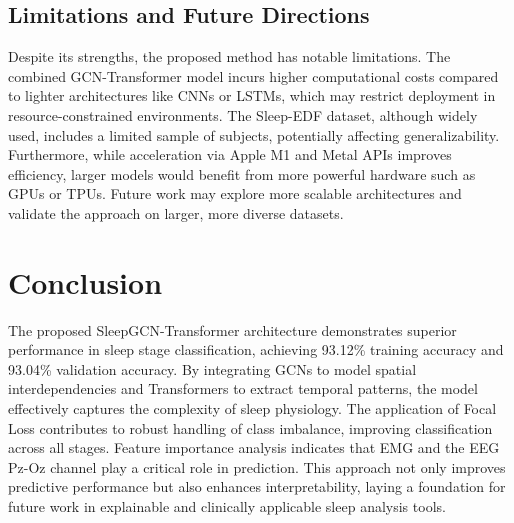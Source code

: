 \subsection{Limitations and Future Directions}
Despite its strengths, the proposed method has notable limitations. The combined GCN-Transformer model incurs higher computational costs compared to lighter architectures like CNNs or LSTMs, which may restrict deployment in resource-constrained environments. The Sleep-EDF dataset, although widely used, includes a limited sample of subjects, potentially affecting generalizability. Furthermore, while acceleration via Apple M1 and Metal APIs improves efficiency, larger models would benefit from more powerful hardware such as GPUs or TPUs. Future work may explore more scalable architectures and validate the approach on larger, more diverse datasets.

\section{Conclusion}

The proposed SleepGCN-Transformer architecture demonstrates superior performance in sleep stage classification, achieving 93.12\% training accuracy and 93.04\% validation accuracy. By integrating GCNs to model spatial interdependencies and Transformers to extract temporal patterns, the model effectively captures the complexity of sleep physiology. The application of Focal Loss contributes to robust handling of class imbalance, improving classification across all stages. Feature importance analysis indicates that EMG and the EEG Pz-Oz channel play a critical role in prediction. This approach not only improves predictive performance but also enhances interpretability, laying a foundation for future work in explainable and clinically applicable sleep analysis tools.
